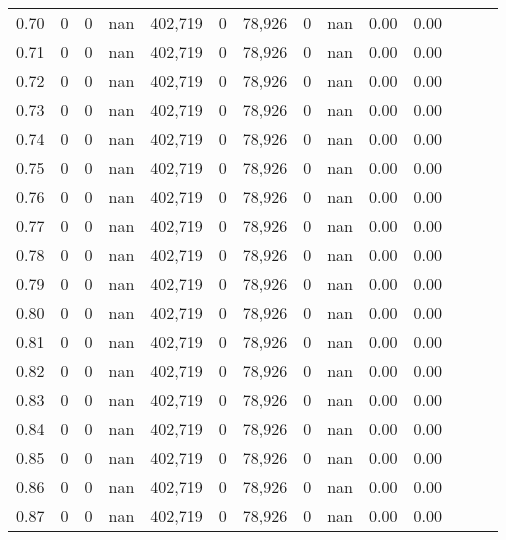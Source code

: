 \begin{tabular}{rrrrrrrrrrrrrr}
0.70 &        0 &       0 &   nan &  402,719 &        0 &  78,926 &       0 &   nan &  0.00 &      0.00 \\
0.71 &        0 &       0 &   nan &  402,719 &        0 &  78,926 &       0 &   nan &  0.00 &      0.00 \\
0.72 &        0 &       0 &   nan &  402,719 &        0 &  78,926 &       0 &   nan &  0.00 &      0.00 \\
0.73 &        0 &       0 &   nan &  402,719 &        0 &  78,926 &       0 &   nan &  0.00 &      0.00 \\
0.74 &        0 &       0 &   nan &  402,719 &        0 &  78,926 &       0 &   nan &  0.00 &      0.00 \\
0.75 &        0 &       0 &   nan &  402,719 &        0 &  78,926 &       0 &   nan &  0.00 &      0.00 \\
0.76 &        0 &       0 &   nan &  402,719 &        0 &  78,926 &       0 &   nan &  0.00 &      0.00 \\
0.77 &        0 &       0 &   nan &  402,719 &        0 &  78,926 &       0 &   nan &  0.00 &      0.00 \\
0.78 &        0 &       0 &   nan &  402,719 &        0 &  78,926 &       0 &   nan &  0.00 &      0.00 \\
0.79 &        0 &       0 &   nan &  402,719 &        0 &  78,926 &       0 &   nan &  0.00 &      0.00 \\
0.80 &        0 &       0 &   nan &  402,719 &        0 &  78,926 &       0 &   nan &  0.00 &      0.00 \\
0.81 &        0 &       0 &   nan &  402,719 &        0 &  78,926 &       0 &   nan &  0.00 &      0.00 \\
0.82 &        0 &       0 &   nan &  402,719 &        0 &  78,926 &       0 &   nan &  0.00 &      0.00 \\
0.83 &        0 &       0 &   nan &  402,719 &        0 &  78,926 &       0 &   nan &  0.00 &      0.00 \\
0.84 &        0 &       0 &   nan &  402,719 &        0 &  78,926 &       0 &   nan &  0.00 &      0.00 \\
0.85 &        0 &       0 &   nan &  402,719 &        0 &  78,926 &       0 &   nan &  0.00 &      0.00 \\
0.86 &        0 &       0 &   nan &  402,719 &        0 &  78,926 &       0 &   nan &  0.00 &      0.00 \\
0.87 &        0 &       0 &   nan &  402,719 &        0 &  78,926 &       0 &   nan &  0.00 &      0.00 \\

\end{tabular}
